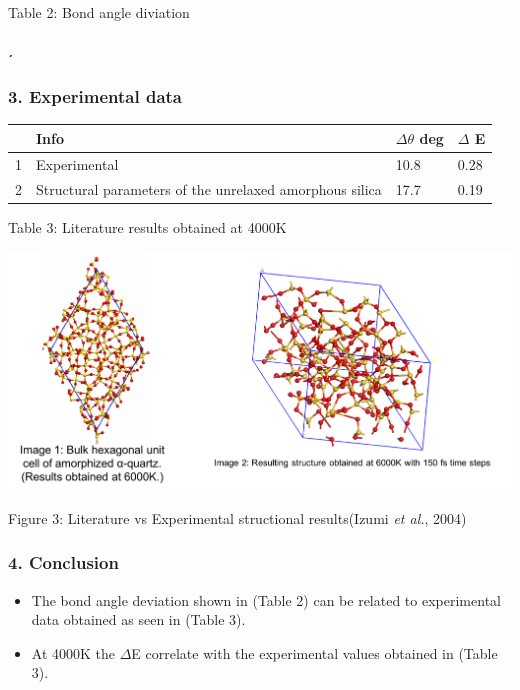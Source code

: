 \documentclass[]{article}
\providecommand{\tightlist}{%
  \setlength{\itemsep}{0pt}\setlength{\parskip}{0pt}}
\let\oldsubparagraph\subparagraph
\renewcommand{\subparagraph}[1]{\oldsubparagraph{#1}\mbox{}}
\begin{document}
Table 2: Bond angle diviation

\hypertarget{section-2}{%
\subparagraph{.}\label{section-2}}

\hypertarget{experimental-data}{%
\subsubsection{3. Experimental data}\label{experimental-data}}

\begin{longtable}[]{@{}llll@{}}
\toprule
& Info & \(\Delta \theta\) deg & \(\Delta\) E\tabularnewline
\midrule
\endhead
1 & Experimental & 10.8 & 0.28\tabularnewline
2 & Structural parameters of the unrelaxed amorphous silica & 17.7 &
0.19\tabularnewline
\bottomrule
\end{longtable}

Table 3: Literature results obtained at 4000K

\begin{center}\includegraphics[width=0.9\linewidth]{../Report1/DATA/amorph-pics} \end{center}

Figure 3: Literature vs Experimental structional results(Izumi \emph{et
al.}, 2004)

\hypertarget{conclusion}{%
\subsubsection{4. Conclusion}\label{conclusion}}

\begin{itemize}
\tightlist
\item
  The bond angle deviation shown in (Table 2) can be related to
  experimental data obtained as seen in (Table 3).
\item
  At 4000K the \(\Delta\)Ε correlate with the experimental values
  obtained in (Table 3).
\end{itemize}
\end{document}
